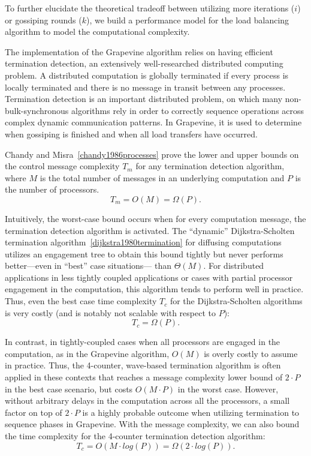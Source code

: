 To further elucidate the theoretical tradeoff between utilizing more iterations
($i$) or gossiping rounds ($k$), we build a performance model for the load
balancing algorithm to model the computational complexity.

The implementation of the \textsf{Grapevine} algorithm relies on having
efficient termination detection, an extensively well-researched distributed
computing problem. A distributed computation is globally terminated if every
process is locally terminated and there is no message in transit between any
processes. Termination detection is an important distributed problem,
on which many non-bulk-synchronous algorithms rely in order to
correctly sequence operations across complex dynamic communication
patterns.
In \textsf{Grapevine}, it is used to determine when gossiping is
finished and when all load transfers have occurred.

Chandy and Misra~\ref{chandy1986processes} prove the lower and upper bounds on
the control message complexity $T_m$ for any termination detection algorithm,
where $M$ is the total number of messages in an underlying computation and $P$
is the number of processors.
\[
T_m = O(M) = \Omega(P).
\]

Intuitively, the worst-case bound occurs when for every computation message, the
termination detection algorithm is activated. The ``dynamic'' Dijkstra-Scholten
termination algorithm~\ref{dijkstra1980termination} for diffusing computations
utilizes an engagement tree to obtain this bound tightly but never performs
better---even in ``best'' case situations--- than $\Theta(M)$. For distributed
applications in less tightly coupled applications or cases with partial
processor engagement in the computation, this algorithm tends to perform well in
practice. Thus, even the best case time complexity $T_c$ for the
Dijkstra-Scholten algorithms is very costly (and is notably not scalable with
respect to $P$):
\[
T_c = \Omega(P).
\]

In contrast, in tightly-coupled cases when all processors are engaged in the
computation, as in the \textsf{Grapevine} algorithm, $O(M)$ is overly costly to
assume in practice. Thus, the 4-counter, wave-based termination algorithm is
often applied in these contexts that reaches a message complexity lower bound of
$2\cdot P$ in the best case scenario, but costs $O(M\cdot P)$ in the worst
case. However, without arbitrary delays in the computation across all the
processors, a small factor on top of $2\cdot P$ is a highly probable outcome
when utilizing termination to sequence phases in \textsf{Grapevine}. With the
message complexity, we can also bound the time complexity for the 4-counter
termination detection algorithm:
\[
T_c = O(M\cdot log(P)) = \Omega(2\cdot log(P)).
\]

